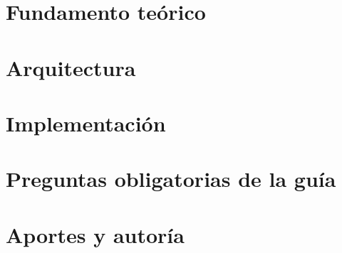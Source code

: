 


\clearpage


\section{Fundamento teórico}




\section{Arquitectura}


\section{Implementación}






\section{Preguntas obligatorias de la guía}








\section{Aportes y autoría}





\printbibliography[title={Referencias}]

